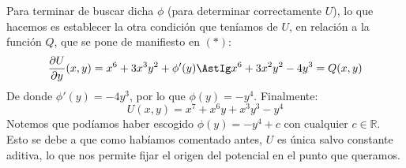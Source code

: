 \begin{ejemplo}
    Para terminar de buscar dicha $\phi$ (para determinar correctamente $U$), lo que hacemos es establecer la otra condición que teníamos de $U$, en relación a la función $Q$, que se pone de manifiesto en $(\ast)$:
    \begin{equation*}
        \dfrac{\partial U}{\partial y}(x,y) = x^6+3x^3y^2 + \phi'(y) \AstIg x^6+3x^2y^2 -4y^3 = Q(x,y)
    \end{equation*}
    De donde $\phi'(y) = -4y^3$, por lo que $\phi(y) = -y^4$. Finalmente:
    \begin{equation*}
        U(x,y) = x^7+x^6y+x^3y^3 -y^4
    \end{equation*}
    Notemos que podíamos haber escogido $\phi(y)=-y^4 + c$ con cualquier $c\in \mathbb{R}$. Esto se debe a que como habíamos comentado antes, $U$ es única salvo constante aditiva, lo que nos permite fijar el origen del potencial en el punto que queramos.
\end{ejemplo}

